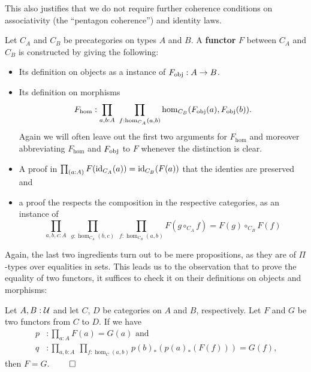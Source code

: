 This also justifies that we do not require further coherence conditions on
associativity (the ``pentagon coherence'') and identity laws. %

\begin{defn} [Functors] \label{def:hott-precat-functor}
Let $C_A$ and $C_B$ be precategories on types $A$ and $B$.
A \textbf{functor} $F$ between $C_A$ and $C_B$ is constructed by giving the following:
\begin{itemize}
\item Its definition on objects as a instance of $F_{\operatorname{obj}}: A \to B$.
\item Its definition on morphisms
\begin{equation*}
F_{\hom} : \prod_{a,b:A} ~ \prod_{f:\hom_{C_A}(a,b)} \hom_{C_B}(F_{\operatorname{obj}}(a),F_{\operatorname{obj}}(b))\text{.}
\end{equation*}
Again we will often leave out the first two arguments for $F_{\hom}$ and moreover
abbreviating $F_{\hom}$ and $F_{\operatorname{obj}}$ to $F$ whenever the distinction is clear.
\item A proof in $\prod_{(a:A)} F(\operatorname{id}_{C_A}(a)) = \operatorname{id}_{C_B}(F(a))$ that the identies
are preserved and
\item a proof the respects the composition in the respective categories, as an instance
of
\begin{equation*}
\prod_{a,b,c:A} ~ \prod_{g:\hom_{C_A}(b,c)} ~ \prod_{f:\hom_{C_B}(a,b)}
F(g \circ_{C_A} f) = F(g) \circ_{C_B} F(f)
\end{equation*}
\end{itemize}
\end{defn}

Again, the last two ingredients turn out to be mere propositions, as they are
of $\Pi$-types over equalities in sets.
This leads us to the observation that to prove the equality of two functors, it
suffices to check it on their definitions on objects and morphisms:

\begin{lemma}
Let $A, B : \mathcal{U}$ and let $C$, $D$ be categories on $A$ and $B$, respectively.
Let $F$ and $G$ be two functors from $C$ to $D$. If we have
\begin{align*}
p &: \prod_{a:A} F(a) = G(a) \text{ and } \\
q &: \prod_{a,b:A} ~ \prod_{f : \hom_C(a,b)} p(b)_*\left(p(a)_*(F(f))\right) = G(f) \text{,}
\end{align*}
then $F = G$. \hfill $\qed$
\end{lemma}

